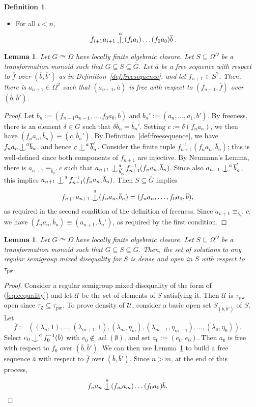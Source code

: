 \documentclass{article}
\newtheorem{lemma}[theorem]{Lemma}
\theoremstyle{remark}
\theoremstyle{definition}
\newtheorem{definition}[theorem]{Definition}
\def\acts{\curvearrowright}
\DeclareMathOperator{\acl}{acl}
\def\G{\overline{G}}
\def\a{\overline{a}}
\def\b{\overline{b}}
\def\f{\overline{f}}
\newcommand{\U}[0]{\mathbb{U}}
\newcommand{\nn}[0]{S}%
\renewcommand{\U}[0]{\mathcal{U}}
\newcommand{\pw}[0]{\tau_{\mathrm{pw}}}
\newcommand{\zar}[0]{\tau_{\mathrm{Z}}}
\def\Ind#1#2{#1\setbox0=\hbox{$#1x$}\kern\wd0\hbox to 0pt{\hss$#1\mid$\hss}
	\lower.9\ht0\hbox to 0pt{\hss$#1\smile$\hss}\kern\wd0}
\def\ind{\mathop{\mathpalette\Ind{}}}
\newcommand{\orq}[0]{\equiv}
\begin{document}
{{{{{\begin{definition}
\begin{itemize}
\item For all $i<n$,
\[f_{i+1}a_{i+1}\ind^{a}%
(f_ia_i)\dots (f_0a_0)\b\;.\]
\end{itemize} 
\end{definition}


\begin{lemma}\label{lem:buildfree} Let $G\acts \Omega$ have  locally finite algebraic closure. Let $S\subseteq \Omega^\Omega$ be a {transformation monoid} such that $G\subseteq  S\subseteq  \G$. Let $\a$ be a free sequence with respect to $\f$ over $(\b, \b')$ as in Definition~\ref{def:freesequence}, and let  $f_{n+1}\in {S}^2$. Then, there is $a_{n+1}\in\Omega^2$ such that $(a_{n+1},\a)$ is free with respect to $(f_{n+1},\f)$ over $(\b, \b')$.
\end{lemma}
\begin{proof} Let 
{$\b_{n}:=(f_{n-1} a_{n-1}, \dots, f_{0}a_{0},\b)$} and $\b_{n}':=(a_{n},\dots, a_1,\b')$.
 By freeness, there is an element $\delta\in G$ such that   $\delta \b_n=\b_n'$. Setting $c:=\delta(f_na_n)$, we then have $(f_{n}a_{n},\b_n)\orq (c,\b_n')$.  By Definition~\ref{def:freesequence}, we have  $f_{n}a_{n}{ \ind^{a} }%
 \b_{n}$, and hence $c \ind^{a} %
 \b_{n}'$. Consider the finite tuple  %
 $f_{n+1}^{-1}(f_na_n,\b_n)$; this is well-defined since both components of  $f_{n+1}$ are injective. By Neumann's Lemma, there is $a_{n+1}\orq_{\b_{n}'}c$ such that %
 $a_{n+1}\ind^{a}_{\b_{n}'} f_{n+1}^{-1}(f_{n}a_n,\b_n)$. Since also $a_{n+1}\ind^{a} \b_n'$, this implies $a_{n+1}\ind^{a}  f_{n+1}^{-1}(f_{n}a_n,\b_n)$. Then $S\subseteq \overline{G}$ implies 
 \[f_{n+1}a_{n+1}\ind^{a}(f_n a_n,\overline{b}_n)=( f_na_n,\dots, f_0a_0,\b),\]
as required in the second condition of the definition of freeness. 
Since $a_{n+1}\orq_{\b_{n}'}c$, we have $(f_{n}a_{n},\b_n)\orq (a_{n+1},\b_n')$, as required by the first condition.
\end{proof}


\begin{lemma}\label{lem:comeagre1} Let $G\acts\Omega$ have locally finite algebraic closure. Let $S\subseteq \Omega^\Omega$ be a transformation monoid such that $G\subseteq S\subseteq \G$. Then, the set of solutions to any regular semigroup mixed {disequality} %
for $S$ is %
{dense and open} in $S$ with respect to $\pw$.
\end{lemma}
\begin{proof} Consider a regular semigroup mixed %
{disequality} 
of the form of (\ref{eq:cequality}) and let $\U$ be {the set of elements of {$S$}
satisfying it. Then $\U$ is $\pw$-open since $\zar\subseteq \pw$.} %
To prove density of $\U$, consider a basic open set   $\nn_{(\b,\b')}$ of $S$.  Let 
\[\f:=((\lambda_n, 1),\dots, (\lambda_{m+1}, 1), (\lambda_m, \eta_m),(\lambda_{m-1}, \eta_{m-1}), \dots, (\lambda_0, \eta_0)).\] 
Select $e_0\ind^a f_0^{-1}(\b)$ with $e_0\not\in\acl(\emptyset)$, and set $a_0:=(e_0, e_0)$. Then $a_0$ is free with respect to $f_0$ over $(\bar b,\bar b')$. We can then use Lemma~\ref{lem:buildfree} to build a free sequence $\a$ with respect to $\f$ over $(\b, \b')$.  Since $n>m$, at the end of this process, 
\[f_n a_n\ind^a(f_m a_{m})\dots  (f_0 a_0)\b.\]


\end{proof}}}}}}
\end{document}
